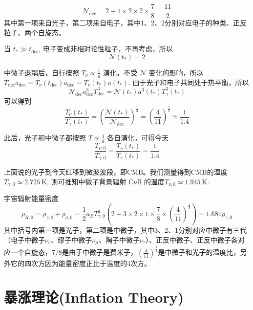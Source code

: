 \documentclass[]{ctexart}
\begin{document}
\begin{equation}
    \mathcal{N}_\text{dec} = 2+ 1\times 2\times 2\times \frac{7}{8} = \frac{11}{2}
\end{equation}
其中第一项来自光子，第二项来自电子，其中1、2、2分别对应电子的种类、正反粒子、两个自旋态。

当 $t_* \gg t_\text{dec}$, 电子变成非相对论性粒子，不再考虑，所以
\begin{equation}
    \mathcal{N}(t_*) = 2
\end{equation}

中微子退耦后，自行按照 $T_\nu \propto \frac{1}{a}$ 演化，不受 $\mathcal{N}$ 变化的影响，所以
$T_\text{dec} a_\text{dec} = T_\nu (t_\text{dec}) a_\text{dec} = T_\nu(t_*) a(t_*)$.
由于光子和电子共同处于热平衡，所以 
\begin{equation}
    \mathcal{N}_\text{dec} a_\text{dec}^3 T_\text{dec}^3 = \mathcal{N}(t_*) a^3(t_*) T_\gamma^3(t_*)
\end{equation}
可以得到
\begin{equation}
    \frac{T_\nu(t_*)}{T_\gamma(t_*)} = \left(\frac{\mathcal{N}(t_*)}{\mathcal{N}_\text{dec}}\right)^\frac{1}{3} = \left(\frac{4}{11}\right)^\frac{1}{3} \simeq \frac{1}{1.4} 
\end{equation}

此后，光子和中微子都按照 $T\propto \frac{1}{a}$ 各自演化，可得今天
\begin{equation}
    \frac{T_{\nu,0}}{T_{\gamma,0}} = \frac{T_\nu(t_*)}{T_\gamma(t_*)} = \frac{1}{1.4}
\end{equation}

上面说的光子到今天红移到微波波段，即CMB。我们测量得到CMB的温度 $T_{\gamma,0}\simeq 2.725 \mathrm{~K}$, 则可推知中微子背景辐射 C$\nu$B 的温度$T_{\nu,0} \simeq 1.945 \mathrm{~K}$.

宇宙辐射能量密度
\begin{equation}
    \rho_{R,0} = \rho_{\gamma,0} + \rho_{\nu,0} = \frac{1}{2} a_B T_{\gamma,0}^4 \left(2+ 3\times 2\times 1\times\frac{7}{8} \times \left(\frac{4}{11}\right)^\frac{4}{3} \right) = 1.681 \rho_{\gamma,0}
\end{equation}
其中括号内第一项是光子，第二项是中微子，其中3、2、1分别对应中微子有三代（电子中微子$\nu_e$、缪子中微子$\nu_\mu$、陶子中微子$\nu_\tau$）、正反中微子、正反中微子各对应一个自旋态，7/8是由于中微子是费米子，$\left(\frac{4}{11}\right)^\frac{1}{3}$是中微子和光子的温度比，另外它的四次方因为能量密度正比于温度的4次方。

\section{暴涨理论(Inflation Theory)}
\end{document}
